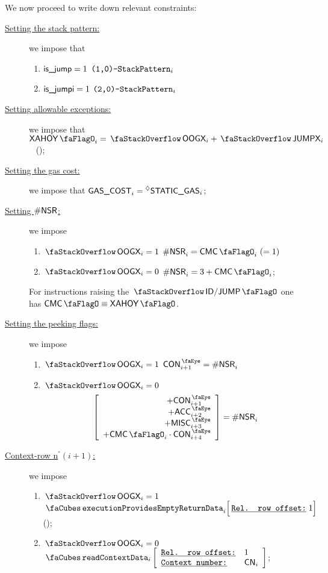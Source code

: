 We now proceed to write down relevant constraints:
\begin{description}
	\item[\underline{Setting the stack pattern:}]
		we impose that
		\begin{enumerate}
			\item \If $\textsf{is\_jump}      = 1$ \Then $\texttt{(1,0)-}\texttt{StackPattern}_{i}$
			\item \If $\textsf{is\_jumpi}     = 1$ \Then $\texttt{(2,0)-}\texttt{StackPattern}_{i}$
		\end{enumerate}
	\item[\underline{Setting allowable exceptions:}]
		we impose that $\xAhoy_{i} = \stackOogx_{i} + \stackJumpx_{i}$ ~ (\trash);
	\item[\underline{Setting the gas cost:}]
		we impose that $\textsf{GAS}\textsf{\_COST}_{i} = \prescript{\lozenge}{}{\textsf{STATIC\_GAS}}_{i}$;
	\item[\underline{Setting $\textsf{\#NSR}$:}]
		we impose
		\begin{enumerate}
			\item \If $\stackOogx_{i} = 1$ \Then $\nonStackRows_{i} = \cmc_{i}~(=1)$
			\item \If $\stackOogx_{i} = 0$ \Then $\nonStackRows_{i} = 3 + \cmc_{i}$;
		\end{enumerate}
		\saNote{} For instructions raising the $\stackDecJumpFlag$ one has $\cmc \equiv \xAhoy$.
	\item[\underline{Setting the peeking flags:}]
		we impose 
		\begin{enumerate}
			\item \If $\stackOogx_{i} = 1$ \Then $ \peekContext_{i + 1} = \nonStackRows_{i} $
			\item \If $\stackOogx_{i} = 0$ \Then
				\[
					\left[ \begin{array}{r}
						+ \peekContext_{i + 1}             \\
						+ \peekAccount_{i + 2}             \\
						+ \peekMisc_{i + 3}                \\
						+ \cmc_{i} \cdot \peekContext_{i + 4} \\
					\end{array} \right]
					= \nonStackRows_{i}
				\]
		\end{enumerate}
	\item[\underline{Context-row n$^°(i + 1)$:}]
		we impose
		\begin{enumerate}
			\item \If $\stackOogx_{i} = 1$ \Then $\executionProvidesEmptyReturnData {i}{1} $ \quad (\trash);
			\item \If $\stackOogx_{i} = 0$ \Then $\readContextData {i}{1}{\cn_{i}}$;
		\end{enumerate}
\end{description}
